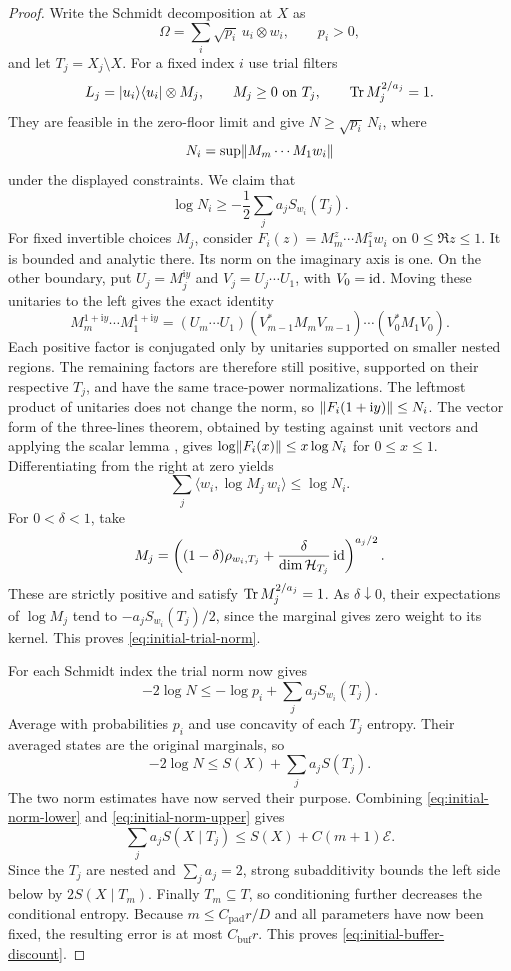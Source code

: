 \begin{proof}
Write the Schmidt decomposition at $X$ as
\[
 \Omega=\sum_i\sqrt{p_i}\,u_i\otimes w_i,
 \qquad p_i>0,
\]
and let $T_j=X_j\setminus X$.  For a fixed index $i$ use trial filters
\[
 L_j=\lvert u_i\rangle\langle u_i\rvert\otimes M_j,
 \qquad M_j\ge0\text{ on }T_j,
 \qquad\operatorname{Tr} M_j^{2/a_j}=1.
\]
They are feasible in the zero-floor limit and give
$N\ge\sqrt{p_i}\,N_i$, where
\[
 N_i=\sup\lVert M_m\cdots M_1w_i\rVert
\]
under the displayed constraints.  We claim that
\begin{equation}
 \log N_i\ge-\frac12\sum_j a_jS_{w_i}(T_j).
 \label{eq:initial-trial-norm}
\end{equation}
For fixed invertible choices $M_j$, consider
$F_i(z)=M_m^z\cdots M_1^z w_i$ on $0\le\Re z\le1$.
It is bounded and analytic there.  Its norm on the imaginary axis is
one.  On the other boundary, put $U_j=M_j^{\mathrm i y}$ and
$V_j=U_j\cdots U_1$, with $V_0=\operatorname{id}$.  Moving these unitaries to the
left gives the exact identity
\[
 M_m^{1+\mathrm i y}\cdots M_1^{1+\mathrm i y}
 =(U_m\cdots U_1)
   (V_{m-1}^*M_mV_{m-1})\cdots(V_0^*M_1V_0).
\]
Each positive factor is conjugated only by unitaries supported on
smaller nested regions.  The remaining factors are
therefore still positive, supported on their respective $T_j$, and
have the same trace-power normalizations.  The leftmost product of
unitaries does not change the norm, so
$\lVert F_i(1+\mathrm i y)\rVert\le N_i$.
The vector form of the three-lines theorem, obtained by testing
against unit vectors and applying the scalar lemma
\cite[Lemma~5.10]{Tao247ANotes1}, gives
$\log\lVert F_i(x)\rVert\le x\log N_i$ for $0\le x\le1$.
Differentiating from the right at zero yields
\[
 \sum_j\langle w_i,\log M_j\,w_i\rangle\le\log N_i.
\]
For $0<\delta<1$, take
\[
 M_j=\left((1-\delta)\rho_{w_i,T_j}
       +\frac{\delta}{\dim\mathcal H_{T_j}}\operatorname{id}\right)^{a_j/2}.
\]
These are strictly positive and satisfy $\operatorname{Tr} M_j^{2/a_j}=1$.
As $\delta\downarrow0$, their expectations of $\log M_j$ tend to
$-a_jS_{w_i}(T_j)/2$, since the marginal gives zero weight to its kernel.
This proves
\eqref{eq:initial-trial-norm}.

For each Schmidt index the trial norm now gives
\[
 -2\log N\le-\log p_i+\sum_j a_jS_{w_i}(T_j).
\]
Average with probabilities $p_i$ and use concavity of each $T_j$
entropy.  Their averaged states are the original marginals, so
\begin{equation}
 -2\log N\le S(X)+\sum_j a_jS(T_j).
 \label{eq:initial-norm-upper}
\end{equation}
The two norm estimates have now served their purpose.  Combining
\eqref{eq:initial-norm-lower} and \eqref{eq:initial-norm-upper} gives
\[
 \sum_j a_j S(X\mid T_j)\le S(X)+C(m+1)\mathcal E.
\]
Since the $T_j$ are nested and $\sum_j a_j=2$, strong subadditivity
bounds the left side below by $2S(X\mid T_m)$.
Finally $T_m\subseteq T$, so conditioning further decreases the
conditional entropy.  Because $m\le C_{\mathrm{pad}}r/D$ and all
parameters have now been fixed, the resulting error is at most
$C_{\mathrm{buf}}r$.  This proves
\eqref{eq:initial-buffer-discount}.
\end{proof}

